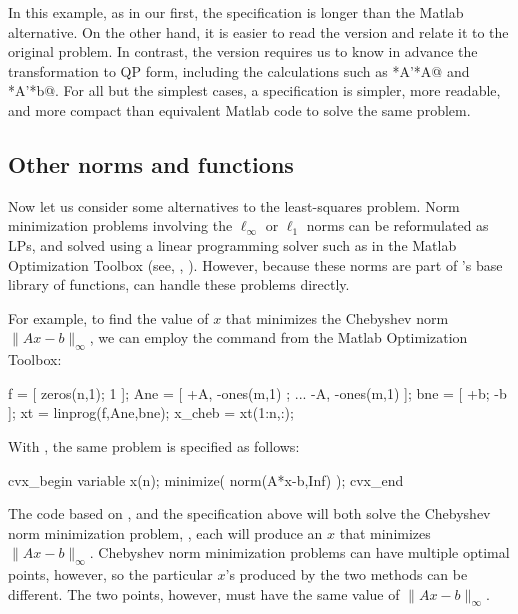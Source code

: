 \documentclass[12pt]{article}
\begin{document}
In this example, as in our first, the \cvx specification is 
longer than the Matlab alternative. On the other hand, it is easier
to read the \cvx version and relate it to the original problem.
In contrast, the \verb@quadprog@ version requires us to know in advance
the transformation to QP form, including the calculations
such as *A'*A@ and *A'*b@.
For all but the simplest cases, a \cvx
specification is simpler, more readable, and more compact than
equivalent Matlab code to solve the same problem.

\subsection{Other norms and functions}
\label{sec:othernorms}

Now let us consider some alternatives to the least-squares problem.
Norm minimization problems involving the $\ell_\infty$ or
$\ell_1$ norms can be reformulated as LPs, and solved using
a linear programming solver such as \verb@linprog@ in the Matlab
Optimization Toolbox (see, \eg, \cite[\S 6.1]{BV:04}). However,
because these norms are part of \cvx's base library of functions,
\cvx can handle these problems directly.

For example, to find the value of $x$ that minimizes
the Chebyshev norm $\|Ax-b\|_\infty$, we can employ the \verb@linprog@
command from the Matlab Optimization Toolbox:
\begin{code2}[firstnumber=98]
	f    = [ zeros(n,1); 1          ];
	Ane  = [ +A,         -ones(m,1)  ; ...
	         -A,         -ones(m,1) ];
	bne  = [ +b;         -b         ];
	xt   = linprog(f,Ane,bne);
	x_cheb = xt(1:n,:);
\end{code2}
With \cvx, the same problem is specified as follows:
\begin{code2}[firstnumber=109]
	cvx_begin
	    variable x(n);
	    minimize( norm(A*x-b,Inf) );
	cvx_end
\end{code2}
The code based on
\verb@linprog@, and the \cvx specification above will both
solve the Chebyshev norm minimization problem, \ie,
each will produce an $x$ that minimizes $\|Ax-b\|_\infty$.
Chebyshev norm minimization problems can have multiple optimal
points, however, so the particular $x$'s produced by the two
methods can be different.  The two points, however, must 
have the same value of $\|Ax-b\|_\infty$.
\end{document}
